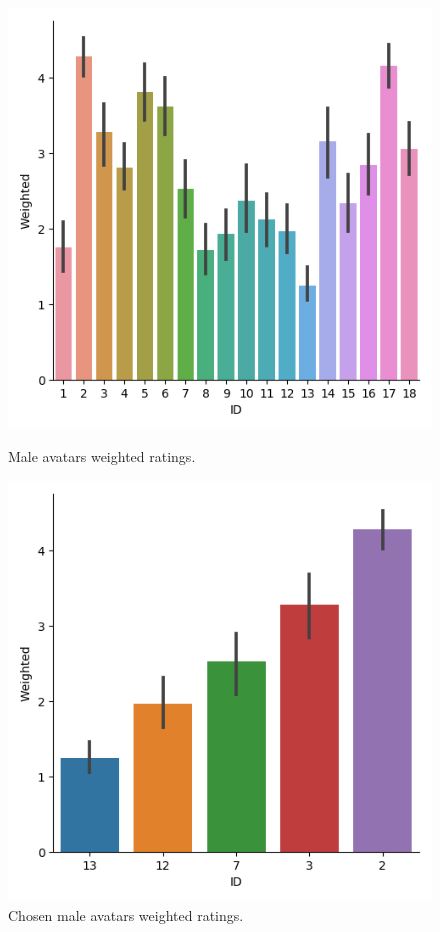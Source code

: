 \begin{figure}[H]
\hspace*{\fill}
\centering
\captionsetup{justification=centering,margin=0.1cm}
  \begin{minipage}[b]{0.4\textwidth}
    \includegraphics[width=\textwidth]{Survey/weighted_ratings_male_survey.png}
    \caption{Male avatars weighted ratings.}
     \label{fig:SurveyRatedMmalesAll}
    \end{minipage}
\hfill
  \begin{minipage}[b]{0.4\textwidth}
    \includegraphics[width=\textwidth]{Survey/weighted_ratings_male_survey_chosen.png}
    \caption{Chosen male avatars weighted ratings.}
     \label{fig:SurveyRatedMalesChosen}
  \end{minipage}
\hspace*{\fill}
\end{figure}


